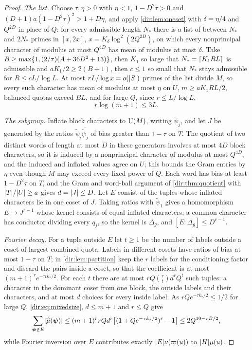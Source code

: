 \begin{proof}
\emph{The list.} Choose $\tau,\eta>0$ with $\eta<1$, $1-D^2\tau>0$ and
$(D+1)a(1-D^2\tau)^2>1+D\eta$, and apply \cref{dir:lem:oneset} with $\delta=\eta/4$ and $Q^{2D}$ in
place of $Q$: for every admissible length $N_*$ there is a list of between $N_*$ and $2N_*$ primes in
$[x,2x]$, $x=K_\delta\log^2(2Q^{2D})$, on which every nonprincipal character of modulus at most
$Q^{4D}$ has mean of modulus at most $\delta$. Take $B\ge\max\{1,(2/\tau)(A+36D^2+13)\}$, then $K_1$
so large that $N_*=\lceil K_1RL\rceil$ is admissible and $aK_1/2\ge2(B+1)$, then $c\le1$ so small that
$N_*$ stays admissible for $R\le cL/\log L$. At most $rL/\log x=o(\lvert S\rvert)$ primes of the list divide
$M$, so every such character has mean of modulus at most $\eta$ on $U$, $m\ge aK_1RL/2$, balanced
quotas exceed $BL$, and for large $Q$, since $r\le L/\log L$,
\begin{equation}\label{dir:eq:mixedsize}
 r\log(m+1)\le3L .
\end{equation}

\emph{The subgroup.} Inflate block characters to $\mathrm{U}(M)$, writing $\widetilde\psi_j$, and let $J$ be
generated by the ratios $\widetilde\psi_i\overline{\widetilde\psi_j}$ of bias greater than $1-\tau$ on $T$.
The quotient of two distinct words of length at most $D$ in these generators involves at most $4D$
block characters, so it is induced by a nonprincipal character of modulus at most $Q^{4D}$, and the
induced and inflated values agree on $U$; this bounds the Gram entries by $\eta$ even though $M$ may
exceed every fixed power of $Q$. Each word has bias at least $1-D^2\tau$ on $T$, and the Gram and
word-ball argument of \cref{dir:thm:quotient} with $\lvert T\rvert/\lvert U\rvert\ge a$ gives $d=\lvert J\rvert\le D$. Let $E$
consist of the tuples whose inflated characters lie in one coset of $J$. Taking ratios with
$\widetilde\psi_1$ gives a homomorphism $E\to J^{r-1}$ whose kernel consists of equal inflated characters;
a common character has conductor dividing every $q_j$, so the kernel is $\Delta_g$, and
$[E:\Delta_g]\le D^{r-1}$.

\emph{Fourier decay.} For a tuple outside $E$ let $t\ge1$ be the number of labels outside a coset of
largest combined quota. Labels in different cosets have ratios of bias at most $1-\tau$ on $T$; in
\cref{dir:lem:partition} keep the $r$ labels for the conditioning factor and discard the pairs inside
a coset, so that the coefficient is at most $(m+1)^re^{-\tau tk_*/2}$. For each $t$ there are at most
$rQ\binom rtd^rQ^t$ such tuples: a character in the dominant coset from one block, the outside labels
and their characters, and at most $d$ choices for every inside label. As $rQe^{-\tau k_*/2}\le1/2$ for
large $Q$, \eqref{dir:eq:mixedsize}, $d\le m+1$ and $r\le Q$ give
\[
 \sum_{\boldsymbol\psi\notin E}\lvert\widehat\mu(\boldsymbol\psi)\rvert\le(m+1)^rrQd^r\bigl[(1+Qe^{-\tau k_*/2})^r-1\bigr]
 \le2Q^{10-\tau B/2},
\]
while Fourier inversion over $E$ contributes exactly $\lvert E\rvert\nu(\varpi(u))$ to $\lvert H\rvert\mu(u)$.


\end{proof}
